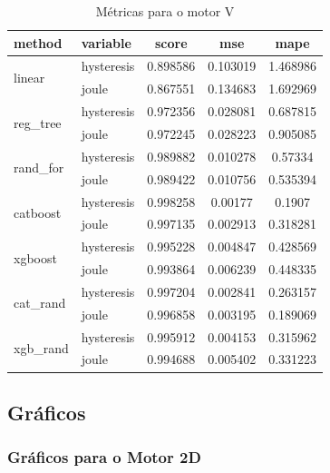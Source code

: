 \documentclass{article}
\begin{document}
\begin{table}[h!]
\centering
\caption{Métricas para o motor V}
\begin{tabular}{llccc}
\toprule
\textbf{method} & \textbf{variable} & \textbf{score} & \textbf{mse} & \textbf{mape} \\
\midrule
\multirow{2}{*}{linear} 
    & hysteresis & 0.898586 & 0.103019 & 1.468986 \\
    & joule      & 0.867551 & 0.134683 & 1.692969 \\
\midrule
\multirow{2}{*}{reg\_tree} 
    & hysteresis & 0.972356 & 0.028081 & 0.687815 \\
    & joule      & 0.972245 & 0.028223 & 0.905085 \\
\midrule
\multirow{2}{*}{rand\_for} 
    & hysteresis & 0.989882 & 0.010278 & 0.57334 \\
    & joule      & 0.989422 & 0.010756 & 0.535394 \\
\midrule
\multirow{2}{*}{catboost} 
    & hysteresis & 0.998258 & 0.00177 & 0.1907 \\
    & joule      & 0.997135 & 0.002913 & 0.318281 \\
\midrule
\multirow{2}{*}{xgboost} 
    & hysteresis & 0.995228 & 0.004847 & 0.428569 \\
    & joule      & 0.993864 & 0.006239 & 0.448335 \\
\midrule
\multirow{2}{*}{cat\_rand} 
    & hysteresis &0.997204 &	0.002841 &	0.263157 \\
    & joule      & 0.996858 &	0.003195 &	0.189069 \\
\midrule
\multirow{2}{*}{xgb\_rand} 
    & hysteresis & 0.995912 &	0.004153 &	0.315962 \\
    & joule      & 0.994688 &	0.005402 &	0.331223 \\
\bottomrule
\end{tabular}
\end{table}

\newpage

\subsection{Gráficos}

\subsubsection{Gráficos para o Motor 2D}
\end{document}

